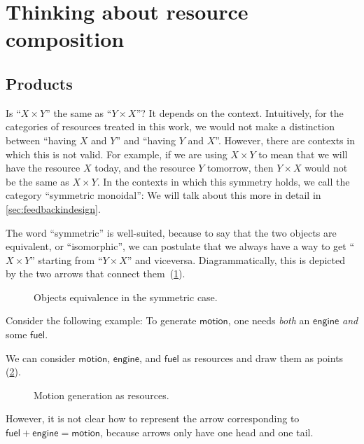 \section{Thinking about resource composition}
\label{sec:productset}
\subsection{Products}
Is ``$X \times Y$'' the same as ``$Y \times X$''?
It depends on the context. Intuitively, for the categories of resources treated in this work, we would not make a distinction
between ``having $X$ and $Y$'' and ``having $Y$ and $X$''.
However, there are contexts in which this is not valid. For example, if we are
using $X \times Y$ to mean that we will have the resource $X$ today, and the
resource $Y$ tomorrow, then $Y \times X$ would not be the same as $X \times Y$. In the contexts in which this symmetry holds, we call the category ``symmetric monoidal'': We will talk about this more in detail in \cref{sec:feedbackindesign}.

The word ``symmetric'' is well-suited, because to say that the two objects are equivalent, or ``isomorphic'', we can postulate that we always have a way to get
``$X \times Y$'' starting from ``$Y \times X$'' and viceversa. Diagrammatically, this is depicted
by the two arrows that connect them~(\cref{fig:e17}).

\begin{figure}[h!]
    \centering
    \caption{Objects equivalence in the symmetric case. \label{fig:e17}}
\end{figure}

\noindent Consider the following example: To generate $\mathsf{motion}$, one needs \emph{both} an $\mathsf{engine}$ \emph{and} some $\mathsf{fuel}$.

We can consider $\mathsf{motion}$, $\mathsf{engine}$, and $\mathsf{fuel}$ as resources and draw them as points (\cref{fig:e11}).

\begin{figure}[h!]
    \centering
    \caption{Motion generation as resources. \label{fig:e11}}
\end{figure}

However, it is not clear how to represent the arrow corresponding to
$\mathsf{fuel} + \mathsf{engine} = \mathsf{motion}$, because arrows only have one head and one tail.

